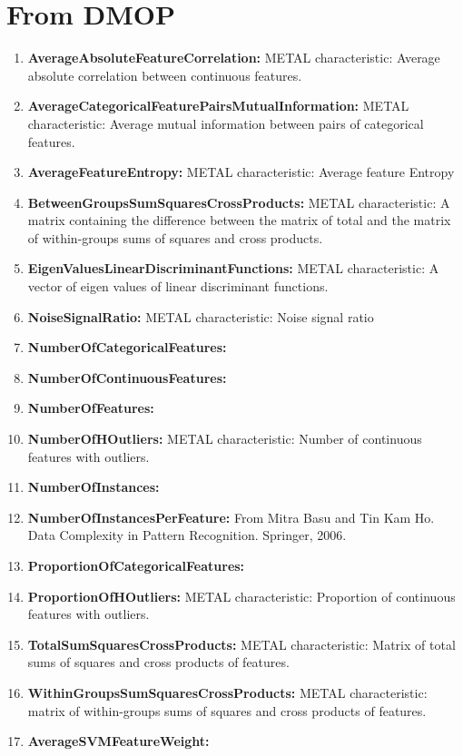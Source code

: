 \documentclass[a4paper,12pt, english]{article}
\begin{document}
\section{From DMOP}
\begin{enumerate}
		\item \textbf{AverageAbsoluteFeatureCorrelation:} METAL characteristic: Average absolute correlation between continuous features.
		\item \textbf{AverageCategoricalFeaturePairsMutualInformation:}  METAL characteristic: Average mutual information between pairs of categorical features. 
		\item \textbf{AverageFeatureEntropy:} METAL characteristic: Average feature Entropy
		\item \textbf{BetweenGroupsSumSquaresCrossProducts:} METAL characteristic: A matrix containing the difference between the matrix of total and the matrix of within-groups sums of squares and cross products.
		\item \textbf{EigenValuesLinearDiscriminantFunctions:} METAL characteristic: A vector of eigen values of linear discriminant functions.
		\item \textbf{NoiseSignalRatio:}  METAL characteristic: Noise signal ratio
		\item \textbf{NumberOfCategoricalFeatures:}
		\item \textbf{NumberOfContinuousFeatures:}
		\item \textbf{NumberOfFeatures:}
		\item \textbf{NumberOfHOutliers:} METAL characteristic: Number of continuous features with outliers.
		\item \textbf{NumberOfInstances:}
		\item \textbf{NumberOfInstancesPerFeature:} From Mitra Basu and Tin Kam Ho. Data Complexity in Pattern Recognition. Springer, 2006. 
		\item \textbf{ProportionOfCategoricalFeatures:}
		\item \textbf{ProportionOfHOutliers:} METAL characteristic: Proportion of continuous features with outliers.
		\item \textbf{TotalSumSquaresCrossProducts:} METAL characteristic: Matrix of total sums of squares and cross products of features.
		\item \textbf{WithinGroupsSumSquaresCrossProducts:} METAL characteristic: matrix of within-groups sums of squares and cross products of features. 
		\item \textbf{AverageSVMFeatureWeight:}
\end{enumerate}  
\end{document}
